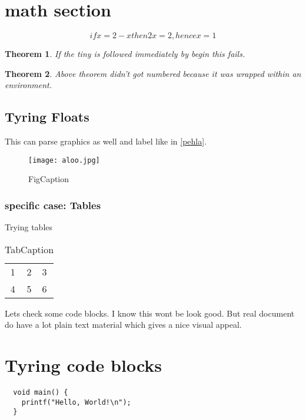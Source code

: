 \documentclass[master.tex]{subfiles}
\newtheorem{theorem}{Theorem}[section]
\begin{document}
  \section{math section}
  \begin{equation}
  if x = 2 - x then 2x = 2, hence x = 1
  \end{equation}

  {\tiny\begin{theorem}
  If the \emph{tiny} is followed immediately by begin this fails.
  \end{theorem}
  }

  \begin{theorem}
    Above theorem didn't got numbered because it was wrapped within an environment.
  \end{theorem}

  \subsection{Tyring Floats}
  This can parse graphics as well and label like in \ref{pehla}.
  \begin{figure}[h]
      \centering
      \texttt{[image: aloo.jpg]}
      \caption{FigCaption}
      \label{fig:my_label}
  \end{figure}

  \subsubsection{specific case: Tables}
  Trying tables
  \begin{table}[]
      \centering
      \begin{tabular}{c|c}
          1 & 2 & 3 \\
          4 & 5 & 6
      \end{tabular}
      \caption{TabCaption}
      \label{tab:my_label}
  \end{table}

  Lets check some code blocks. I know this wont be look good. But real document
  do have a lot plain text material which gives a nice visual appeal.

\section{Tyring code blocks}
  \begin{lstlisting}
  void main() {
    printf("Hello, World!\n");
  }
  \end{lstlisting}
\end{document}
